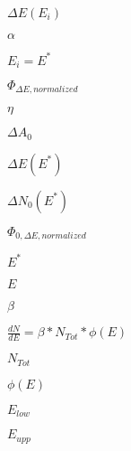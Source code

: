 \documentclass{article}
\begin{document}
$ \Delta E(E_{i}) $
\pagebreak

$ \alpha $
\pagebreak

$ E_{i}=E^{*} $
\pagebreak

$ \Phi_{\Delta E, normalized} $
\pagebreak

$ \eta $
\pagebreak

$ \Delta A_{0} $
\pagebreak

$ \Delta E(E^{*}) $
\pagebreak

$ \Delta N_{0}(E^{*}) $
\pagebreak

$ \Phi_{0, \Delta E, normalized} $
\pagebreak

$ E^{*} $
\pagebreak

$ E $
\pagebreak

$ \beta $
\pagebreak

$ \frac{dN}{dE} = \beta * N_{Tot} * \phi(E) $
\pagebreak

$ N_{Tot} $
\pagebreak

$ \phi(E) $
\pagebreak

$ E_{low} $
\pagebreak

$ E_{upp} $
\pagebreak
\end{document}
